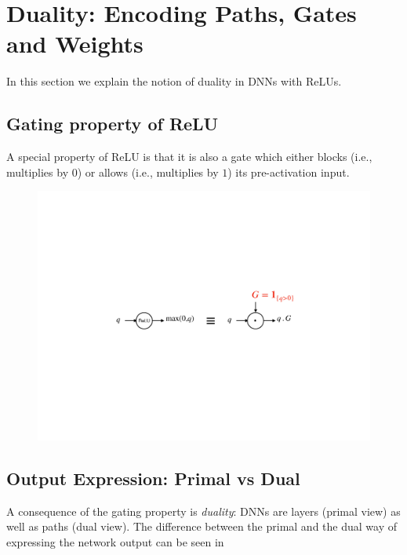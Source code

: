 \section{Duality: Encoding Paths, Gates and Weights}
In this section we explain the notion of duality in DNNs with ReLUs. 
\subsection{Gating property of ReLU}
A special property of ReLU is that it is also a gate which either blocks (i.e., multiplies by $0$) or allows (i.e., multiplies by $1$) its pre-activation input. 
\FloatBarrier
\begin{figure}[H]
\includegraphics[scale=0.4]{figs/gating.pdf}
\end{figure}
\subsection{Output Expression: Primal vs Dual}
A consequence of the gating property is \emph{duality}: DNNs are layers (primal view) as well as paths (dual view). The difference between the primal and the dual way of expressing the network output can be seen in 
\FloatBarrier
\begin{table}[H]
\caption{$\Theta(l),l=1,\ldots,d$ is the weight of layer $l$.}
\label{tb:primal-dual}
\end{table}
